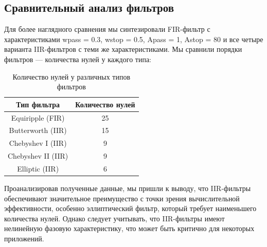 \subsection{Сравнительный анализ фильтров}
Для более наглядного сравнения мы синтезировали FIR-фильтр с характеристиками wpass = 0.3, wstop = 0.5, Apass = 1, Astop = 80 и все четыре варианта IIR-фильтров с теми же характеристиками. Мы сравнили порядки фильтров — количества нулей у каждого типа:

\begin{longtable}[c]{|c|c|}
\caption{Количество нулей у различных типов фильтров}
\label{tab:filter_zeros}\\
\hline
Тип фильтра & Количество нулей \\ \hline
\endfirsthead
%
\endhead
%
Equiripple (FIR) & 25 \\ \hline
Butterworth (IIR) & 15 \\ \hline
Chebyshev I (IIR) & 9 \\ \hline
Chebyshev II (IIR) & 9 \\ \hline
Elliptic (IIR) & 6 \\ \hline
\end{longtable}

Проанализировав полученные данные, мы пришли к выводу, что IIR-фильтры обеспечивают значительное преимущество с точки зрения вычислительной эффективности, особенно эллиптический фильтр, который требует наименьшего количества нулей. Однако следует учитывать, что IIR-фильтры имеют нелинейную фазовую характеристику, что может быть критично для некоторых приложений.
